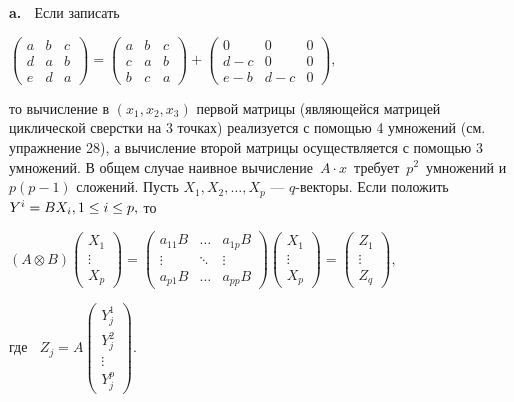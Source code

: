 \documentclass{../../template/mai_book}
\begin{document}
\textbf{a.} $\;$ Если записать 
\begin{center}
$\begin{pmatrix}
a & b & c \\
d & a & b \\         
e & d & a
\end{pmatrix} = \begin{pmatrix}
a & b & c \\
c & a & b \\         
b & c & a
\end{pmatrix} + \begin{pmatrix}
0 & 0 & 0 \\
d - c & 0 & 0 \\         
e - b &d - c & 0
\end{pmatrix},$
\end{center}
то вычисление в $(x_1 , x_2 , x_3)$ первой матрицы (являющейся матрицей циклической сверстки на 3 точках) реализуется с помощью 4 умножений	
\newpage
\noindent
(см. упражнение 28), а вычисление второй матрицы осуществляется с помощью 3 умножений. \newline \newline \indent
В общем случае наивное вычисление $\, A \cdot x \,$ требует $\, p^2 \,$ умножений и $p(p - 1)$ сложений. Пусть $X_1 , X_2 , \dots , X_p$ --- $q$-векторы. Если положить $Y^i = BX_i, \, \\ 1 \le i \le p,$ то \newline
\begin{center}
$(A \otimes B) \begin{pmatrix}
X_1 \\
\vdots \\
X_p
\end{pmatrix} = \begin{pmatrix}
a_{11}B & \dots & a_{1p}B \\
\vdots & \ddots & \vdots \\
a_{p1}B & \dots & a_{pp}B
\end{pmatrix} \begin{pmatrix}
X_1 \\
\vdots \\
X_p
\end{pmatrix} = \begin{pmatrix}
Z_1 \\
\vdots \\
Z_q
\end{pmatrix},$
\end{center}
\begin{center}
где $\;\;Z_j = A\begin{pmatrix}
Y_j^1 \\
Y_j^2 \\
\vdots \\
Y_j^p
\end{pmatrix}.$
\end{center} 
\end{document}
